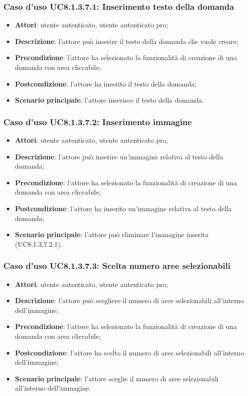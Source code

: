 \subsubsection{Caso d'uso UC8.1.3.7.1: Inserimento testo della domanda}
\begin{itemize}
	\item \textbf{Attori}: utente autenticato, utente autenticato pro;
	\item \textbf{Descrizione}: l'attore può inserire il testo della domanda che vuole creare;
	\item \textbf{Precondizione}: l'attore ha selezionato la funzionalità di creazione di una domanda con area cliccabile;
	\item \textbf{Postcondizione}: l'attore ha inserito il testo della domanda;
	\item \textbf{Scenario principale}: l'attore inserisce il testo della domanda. 
\end{itemize}

\subsubsection{Caso d'uso UC8.1.3.7.2: Inserimento immagine}
\begin{itemize}
	\item \textbf{Attori}: utente autenticato, utente autenticato pro;
	\item \textbf{Descrizione}: l'attore può inserire un'immagine relativa al testo della domanda;
	\item \textbf{Precondizione}: l'attore ha selezionato la funzionalità di creazione di una domanda con area cliccabile; 
	\item \textbf{Postcondizione}: l'attore ha inserito un'immagine relativa al testo della domanda;
	\item \textbf{Scenario principale}: l'attore può eliminare l'immagine inserita (UC8.1.3.7.2.1).			
	\end{itemize}

\subsubsection{Caso d'uso UC8.1.3.7.3: Scelta numero aree selezionabili}
\begin{itemize}
	\item \textbf{Attori}: utente autenticato, utente autenticato pro;
	\item \textbf{Descrizione}: l'attore può scegliere il numero di aree selezionabili all'interno dell'immagine;
	\item \textbf{Precondizione}: l'attore ha selezionato la funzionalità di creazione di una domanda con area cliccabile; 
	\item \textbf{Postcondizione}: l'attore ha scelto il numero di aree selezionabili all'interno dell'immagine;
	\item \textbf{Scenario principale}: l'attore sceglie il numero di aree selezionabili all'interno dell'immagine. 	
\end{itemize}

